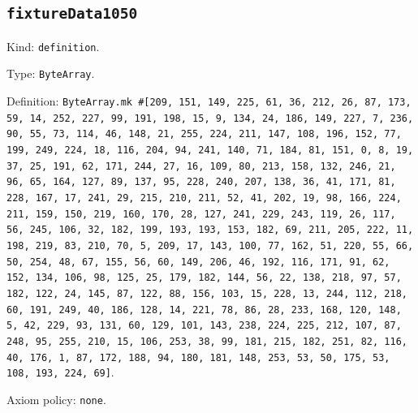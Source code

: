 \documentclass[11pt]{article}
\begin{document}
\subsection*{\texttt{fixtureData1050}}
\noindent Kind: \texttt{definition}.\par
\noindent Type: \texttt{ByteArray}.\par
\noindent Definition: \texttt{ByteArray.mk \#[209, 151, 149, 225, 61, 36, 212, 26, 87, 173, 59, 14, 252, 227, 99, 191, 198, 15, 9, 134, 24, 186, 149, 227, 7, 236, 90, 55, 73, 114, 46, 148, 21, 255, 224, 211, 147, 108, 196, 152, 77, 199, 249, 224, 18, 116, 204, 94, 241, 140, 71, 184, 81, 151, 0, 8, 19, 37, 25, 191, 62, 171, 244, 27, 16, 109, 80, 213, 158, 132, 246, 21, 96, 65, 164, 127, 89, 137, 95, 228, 240, 207, 138, 36, 41, 171, 81, 228, 167, 17, 241, 29, 215, 210, 211, 52, 41, 202, 19, 98, 166, 224, 211, 159, 150, 219, 160, 170, 28, 127, 241, 229, 243, 119, 26, 117, 56, 245, 106, 32, 182, 199, 193, 193, 153, 182, 69, 211, 205, 222, 11, 198, 219, 83, 210, 70, 5, 209, 17, 143, 100, 77, 162, 51, 220, 55, 66, 50, 254, 48, 67, 155, 56, 60, 149, 206, 46, 192, 116, 171, 91, 62, 152, 134, 106, 98, 125, 25, 179, 182, 144, 56, 22, 138, 218, 97, 57, 182, 122, 24, 145, 87, 122, 88, 156, 103, 15, 228, 13, 244, 112, 218, 60, 191, 249, 40, 186, 128, 14, 221, 78, 86, 28, 233, 168, 120, 148, 5, 42, 229, 93, 131, 60, 129, 101, 143, 238, 224, 225, 212, 107, 87, 248, 95, 255, 210, 15, 106, 253, 38, 99, 181, 215, 182, 251, 82, 116, 40, 176, 1, 87, 172, 188, 94, 180, 181, 148, 253, 53, 50, 175, 53, 108, 193, 224, 69]}.\par
\noindent Axiom policy: \texttt{none}.\par
\end{document}
